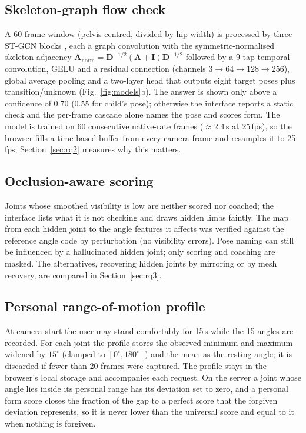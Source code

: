 \subsection{Skeleton-graph flow check}\label{sec:stgcn}
A 60-frame window (pelvis-centred, divided by hip width) is processed by three ST-GCN blocks \cite{yan2018stgcn}, each a graph convolution with the symmetric-normalised skeleton adjacency $\mathbf{A}_{\mathrm{norm}}=\mathbf{D}^{-1/2}(\mathbf{A}+\mathbf{I})\mathbf{D}^{-1/2}$ followed by a 9-tap temporal convolution, GELU and a residual connection (channels $3\to64\to128\to256$), global average pooling and a two-layer head that outputs eight target poses plus transition/unknown (Fig.~\ref{fig:models}b). The answer is shown only above a confidence of 0.70 (0.55 for child's pose); otherwise the interface reports a static check and the per-frame cascade alone names the pose and scores form. The model is trained on 60 consecutive native-rate frames ($\approx$2.4\,s at 25\,fps), so the browser fills a time-based buffer from every camera frame and resamples it to 25\,fps; Section~\ref{sec:rq2} measures why this matters.

\subsection{Occlusion-aware scoring}
Joints whose smoothed visibility is low are neither scored nor coached; the interface lists what it is not checking and draws hidden limbs faintly. The map from each hidden joint to the angle features it affects was verified against the reference angle code by perturbation (no visibility errors). Pose naming can still be influenced by a hallucinated hidden joint; only scoring and coaching are masked. The alternatives, recovering hidden joints by mirroring or by mesh recovery, are compared in Section~\ref{sec:rq3}.

\subsection{Personal range-of-motion profile}\label{sec:calib}
At camera start the user may stand comfortably for 15\,s while the 15 angles are recorded. For each joint the profile stores the observed minimum and maximum widened by $15^\circ$ (clamped to $[0^\circ,180^\circ]$) and the mean as the resting angle; it is discarded if fewer than 20 frames were captured. The profile stays in the browser's local storage and accompanies each request. On the server a joint whose angle lies inside its personal range has its deviation set to zero, and a personal form score closes the fraction of the gap to a perfect score that the forgiven deviation represents, so it is never lower than the universal score and equal to it when nothing is forgiven.

